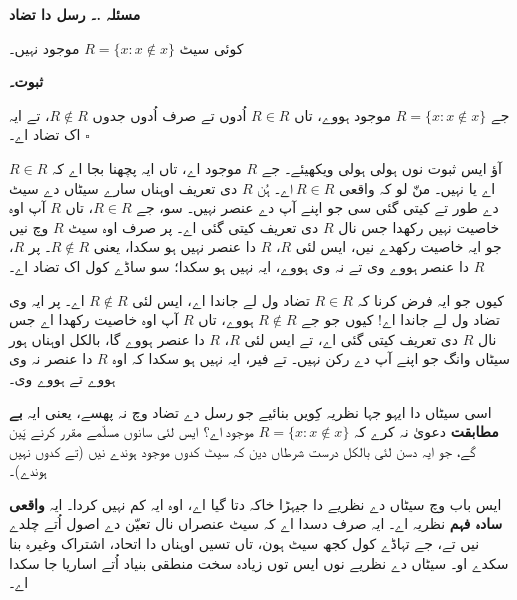 \documentclass[12pt,a4paper,oneside,openany]{book}
\renewcommand{\emph}[1]{{\upshape\bfseries #1}}
\newcommand{\Setabs}[2]{\{#1:#2\}}
\newenvironment{tagblock}[1]{}{}
\newenvironment{explain}{}{}
\newenvironment{digress}{\par}{\par}
\newcounter{statement}[section]
\renewcommand{\thestatement}{\thesection.\arabic{statement}}
\newcommand{\pnbstatement}[2]{\par\Needspace{4\baselineskip}\refstepcounter{statement}\textbf{#1 \textenglish{\thestatement}۔ #2}\par\nobreak}
\newenvironment{thm}[1][]{\pnbstatement{مسئلہ}{#1}}{\par}
\newenvironment{proof}{\par\Needspace{4\baselineskip}\textbf{ثبوت۔}\par\nobreak}{\hfill\(\square\)\par}
\begin{document}
\begin{Arabic}
\begin{thm}[رسل دا تضاد]\label{sfr:set:rus:thm:russells-paradox}
	کوئی سیٹ $R = \Setabs{x}{x \notin x}$ موجود نہیں۔
\end{thm}

\begin{proof}
جے $R = \Setabs{x}{x \notin x}$ موجود ہووے، تاں
$R \in R$ اُدوں تے صرف اُدوں جدوں $R \notin R$، تے ایہ اک تضاد اے۔
\end{proof}

\begin{tagblock}{novice}
\begin{explain}
آؤ ایس ثبوت نوں ہولی ہولی ویکھیئے۔ جے $R$ موجود اے، تاں ایہ پچھنا بجا اے
کہ $R \in R$ اے یا نہیں۔ منّ لو کہ واقعی $R \in R$ اے۔ ہُن $R$ دی
تعریف اوہناں سارے سیٹاں دے سیٹ دے طور تے کیتی گئی سی جو اپنے آپ دے
عنصر نہیں۔ سو، جے $R \in R$، تاں $R$ آپ اوہ خاصیت نہیں رکھدا
جس نال $R$ دی تعریف کیتی گئی اے۔ پر صرف اوہ سیٹ $R$ وچ نیں جو ایہ
خاصیت رکھدے نیں، ایس لئی $R$، $R$ دا عنصر نہیں ہو سکدا، یعنی
$R \notin R$۔ پر $R$، $R$ دا عنصر ہووے وی تے نہ وی ہووے، ایہ
نہیں ہو سکدا؛ سو ساڈے کول اک تضاد اے۔

کیوں جو ایہ فرض کرنا کہ $R \in R$ تضاد ول لے جاندا اے، ایس لئی
$R \notin R$ اے۔ پر ایہ وی تضاد ول لے جاندا اے!{} کیوں جو جے $R \notin R$
ہووے، تاں $R$ آپ اوہ خاصیت رکھدا اے جس نال $R$ دی تعریف کیتی گئی اے،
تے ایس لئی $R$، $R$ دا عنصر ہووے گا، بالکل اوہناں ہور سیٹاں
وانگ جو اپنے آپ دے رکن نہیں۔ تے فیر، ایہ نہیں ہو سکدا کہ اوہ $R$ دا
عنصر نہ وی ہووے تے ہووے وی۔
\end{explain}
\end{tagblock}

\begin{digress}
اسی سیٹاں دا ایہو جہا نظریہ کِویں بنائیے جو رسل دے تضاد وچ نہ پھسے، یعنی
ایہ \emph{بے مطابقت} دعویٰ نہ کرے کہ $R = \Setabs{x}{x \notin x}$
موجود اے؟ ایس لئی سانوں مسلّمے مقرر کرنے پَین گے، جو ایہ دسن لئی بالکل
درست شرطاں دین کہ سیٹ کدوں موجود ہوندے نیں (تے کدوں نہیں ہوندے)۔

ایس باب وچ سیٹاں دے نظریے دا جیہڑا خاکہ دتا گیا اے، اوہ ایہ کم نہیں کردا۔
ایہ \emph{واقعی سادہ فہم} نظریہ اے۔ ایہ صرف دسدا اے کہ سیٹ عنصراں نال
تعیّن دے اصول اُتے چلدے نیں تے، جے تہاڈے کول کجھ سیٹ ہون، تاں تسیں اوہناں
دا اتحاد، اشتراک وغیرہ بنا سکدے او۔ سیٹاں دے نظریے نوں ایس توں زیادہ
سخت منطقی بنیاد اُتے اساریا جا سکدا اے۔ 
\end{digress}



\end{Arabic}
\end{document}
